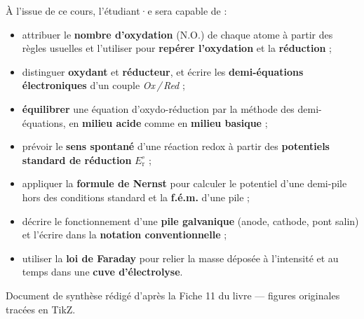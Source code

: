 \documentclass[11pt,a4paper]{article}
\newcommand{\NO}{\ensuremath{\mathrm{N.O.}}}    %
\begin{document}
\vspace{0.4cm}

\begin{tcolorbox}[boxbase,colback=primary!5,colframe=primary,width=15.2cm,
    title={\textsc{Objectifs pédagogiques de la fiche}}]
À l'issue de ce cours, l'étudiant·e sera capable de :
\begin{itemize}[leftmargin=1.6em,topsep=2pt,itemsep=1pt]
  \item attribuer le \textbf{nombre d'oxydation} ($\NO$) de chaque atome à partir des règles
        usuelles et l'utiliser pour \textbf{repérer l'oxydation} et la \textbf{réduction} ;
  \item distinguer \textbf{oxydant} et \textbf{réducteur}, et écrire les \textbf{demi-équations
        électroniques} d'un couple \emph{Ox\,/\,Red} ;
  \item \textbf{équilibrer} une équation d'oxydo-réduction par la méthode des demi-équations,
        en \textbf{milieu acide} comme en \textbf{milieu basique} ;
  \item prévoir le \textbf{sens spontané} d'une réaction redox à partir des \textbf{potentiels
        standard de réduction} $E_{\mathrm{r}}^{\circ}$ ;
  \item appliquer la \textbf{formule de Nernst} pour calculer le potentiel d'une demi-pile hors
        des conditions standard et la \textbf{f.é.m.} d'une pile ;
  \item décrire le fonctionnement d'une \textbf{pile galvanique} (anode, cathode, pont salin) et
        l'écrire dans la \textbf{notation conventionnelle} ;
  \item utiliser la \textbf{loi de Faraday} pour relier la masse déposée à l'intensité et au temps
        dans une \textbf{cuve d'électrolyse}.
\end{itemize}
\end{tcolorbox}

\vspace{0.35cm}
{\small\color{black!60} Document de synthèse rédigé d'après la Fiche 11 du livre — figures originales tracées en TikZ.}
\par
\endgroup

\newpage
\renewcommand{\contentsname}{\textcolor{primarydark}{Table des matières}}
\tableofcontents
\thispagestyle{fancy}
\newpage

\end{document}
